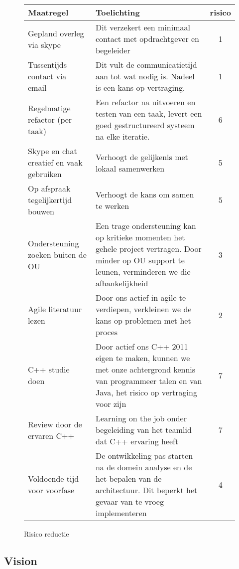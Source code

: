 \begin{figure}[!ht]
\begin{center}
\tiny
\begin{tabular}{|p{20em}p{30em}c|}
\hline
    {\bf Maatregel} & {\bf Toelichting} & {\bf risico} \\\hline
    Gepland overleg via skype & Dit verzekert een minimaal contact met opdrachtgever en begeleider & 1\\\hline
    Tussentijds contact via email & Dit vult de communicatietijd aan tot wat nodig is. Nadeel is
				    een kans op vertraging. & 1\\\hline
    Regelmatige refactor (per taak) & Een refactor na uitvoeren en testen van een taak, levert
					een goed gestructureerd systeem na elke iteratie. & 6\\\hline
    Skype en chat creatief en vaak gebruiken & Verhoogt de gelijkenis met lokaal samenwerken & 5\\\hline
    Op afspraak tegelijkertijd bouwen & Verhoogt de kans om samen te werken & 5\\\hline
    Ondersteuning zoeken buiten de OU & Een trage ondersteuning kan op kritieke momenten
					het gehele project vertragen. Door minder op
					OU support te leunen, verminderen we die afhankelijkheid & 3\\\hline
    Agile literatuur lezen & Door ons actief in agile te verdiepen, verkleinen we de kans op
				problemen met het proces & 2\\\hline
    C++ studie doen & Door actief ons C++ 2011 eigen te maken, kunnen we
			met onze achtergrond kennis van programmeer talen en
			van Java, het risico op vertraging voor zijn & 7\\\hline
    Review door de ervaren C++ & Learning on the job onder begeleiding van
				het teamlid dat C++ ervaring heeft & 7\\\hline
    Voldoende tijd voor voorfase & De ontwikkeling pas starten na de domein
				analyse en de het bepalen van de architectuur.
				Dit beperkt het gevaar van te vroeg implementeren & 4\\\hline
\end{tabular}
\end{center}
 \caption{Risico reductie}\label{fig: risico reductie}
\end{figure}


\subsection{Vision}\label{sec: vision}

